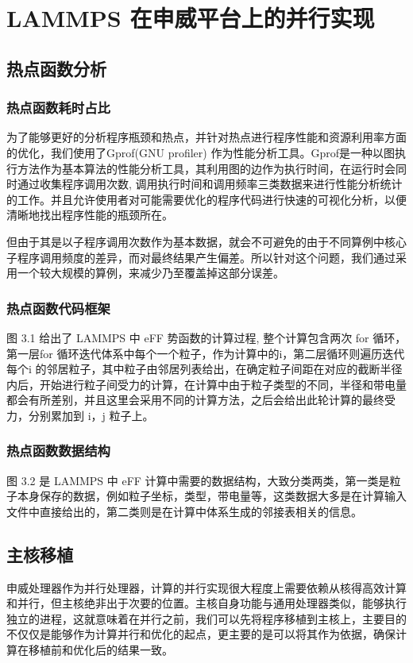 
\chapter{LAMMPS 在申威平台上的并行实现}

\section{热点函数分析}
\subsection{热点函数耗时占比}
为了能够更好的分析程序瓶颈和热点，并针对热点进行程序性能和资源利用率方面的优化，我们使用了Gprof(GNU profiler)\cite{graham1982gprof} 作为性能分析工具。Gprof是一种以图执行方法作为基本算法的性能分析工具，其利用图的边作为执行时间，在运行时会同时通过收集程序调用次数, 调用执行时间和调用频率三类数据来进行性能分析统计的工作。并且允许使用者对可能需要优化的程序代码进行快速的可视化分析，以便清晰地找出程序性能的瓶颈所在。

但由于其是以子程序调用次数作为基本数据，就会不可避免的由于不同算例中核心子程序调用频度的差异，而对最终结果产生偏差。所以针对这个问题，我们通过采用一个较大规模的算例，来减少乃至覆盖掉这部分误差。

\subsection{热点函数代码框架}
图 3.1 给出了 LAMMPS 中 eFF 势函数的计算过程, 整个计算包含两次 for 循环，第一层for 循环迭代体系中每个一个粒子，作为计算中的i，第二层循环则遍历迭代每个i 的邻居粒子，其中粒子由邻居列表给出，在确定粒子间距在对应的截断半径内后，开始进行粒子间受力的计算，在计算中由于粒子类型的不同，半径和带电量都会有所差别，并且这里会采用不同的计算方法，之后会给出此轮计算的最终受力，分别累加到 i，j 粒子上。

\subsection{热点函数数据结构}
图 3.2 是 LAMMPS 中 eFF 计算中需要的数据结构，大致分类两类，第一类是粒子本身保存的数据，例如粒子坐标，类型，带电量等，这类数据大多是在计算输入文件中直接给出的，第二类则是在计算中体系生成的邻接表相关的信息。

\section{主核移植}
申威处理器作为并行处理器，计算的并行实现很大程度上需要依赖从核得高效计算和并行，但主核绝非出于次要的位置。主核自身功能与通用处理器类似，能够执行独立的进程，这就意味着在并行之前，我们可以先将程序移植到主核上，主要目的不仅仅是能够作为计算并行和优化的起点，更主要的是可以将其作为依据，确保计算在移植前和优化后的结果一致。

